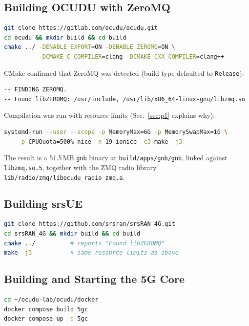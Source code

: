 \documentclass[11pt,a4paper]{article}
\newcommand{\fpath}[1]{\texttt{#1}}
\begin{document}
\subsection{Building OCUDU with ZeroMQ}

\begin{lstlisting}[language=bash]
git clone https://gitlab.com/ocudu/ocudu.git
cd ocudu && mkdir build && cd build
cmake ../ -DENABLE_EXPORT=ON -DENABLE_ZEROMQ=ON \
          -DCMAKE_C_COMPILER=clang -DCMAKE_CXX_COMPILER=clang++
\end{lstlisting}

CMake confirmed that ZeroMQ was detected (build type defaulted to
\texttt{Release}):
\begin{lstlisting}
-- FINDING ZEROMQ.
-- Found libZEROMQ: /usr/include, /usr/lib/x86_64-linux-gnu/libzmq.so
\end{lstlisting}

Compilation was run with resource limits (Sec.~\ref{sec:p1} explains why):
\begin{lstlisting}[language=bash]
systemd-run --user --scope -p MemoryMax=6G -p MemorySwapMax=1G \
    -p CPUQuota=500% nice -n 19 ionice -c3 make -j3
\end{lstlisting}

The result is a 51.5\,MB \texttt{gnb} binary at
\fpath{build/apps/gnb/gnb}, linked against \texttt{libzmq.so.5}, together with
the ZMQ radio library \fpath{lib/radio/zmq/libocudu\_radio\_zmq.a}.

\subsection{Building srsUE}

\begin{lstlisting}[language=bash]
git clone https://github.com/srsran/srsRAN_4G.git
cd srsRAN_4G && mkdir build && cd build
cmake ../          # reports "Found libZEROMQ"
make -j3           # same resource limits as above
\end{lstlisting}

\subsection{Building and Starting the 5G Core}

\begin{lstlisting}[language=bash]
cd ~/ocudu-lab/ocudu/docker
docker compose build 5gc
docker compose up -d 5gc
\end{lstlisting}
\end{document}
